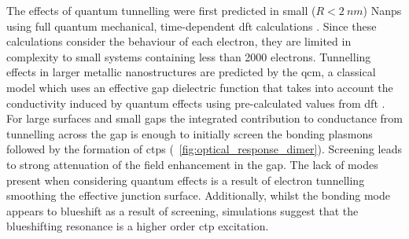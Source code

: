 \documentclass{article}
\begin{document}
The effects of quantum tunnelling were first predicted in small ($R<\SI{2}{nm}$) Na\glspl{np} using full quantum mechanical, time-dependent \gls{dft} calculations \cite{zuloaga2009}. Since these calculations consider the behaviour of each electron, they are limited in complexity to small systems containing less than 2000 electrons. Tunnelling effects in larger metallic nanostructures are predicted by the \gls{qcm}, a classical model which uses an effective gap dielectric function that takes into account the conductivity induced by quantum effects using pre-calculated values from \gls{dft} \cite{esteban2012}. For large surfaces and small gaps the integrated contribution to conductance from tunnelling across the gap is enough to initially screen the bonding plasmons followed by the formation of \glspl{ctp} (\figurename~\ref{fig:optical_response_dimer}). Screening leads to strong attenuation of the field enhancement in the gap. The lack of modes present when considering quantum effects is a result of electron tunnelling smoothing the effective junction surface. {\color{red}Additionally, whilst the bonding mode appears to blueshift as a result of screening, simulations suggest that the blueshifting resonance is a higher order \gls{ctp} excitation.}
\end{document}
